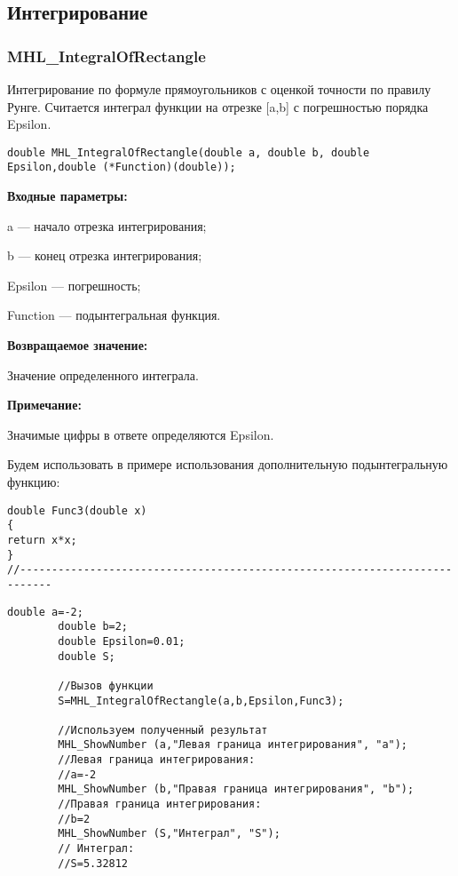 \documentclass[a4paper,12pt]{article}
\begin{document}
\subsection{Интегрирование}

\subsubsection{MHL\_IntegralOfRectangle}\label{MHL_IntegralOfRectangle}

Интегрирование по формуле прямоугольников с оценкой точности по правилу Рунге. Считается интеграл функции на отрезке [a,b] с погрешностью порядка Epsilon.


\begin{lstlisting}[label=code_syntax_MHL_IntegralOfRectangle,caption=Синтаксис]
double MHL_IntegralOfRectangle(double a, double b, double Epsilon,double (*Function)(double));
\end{lstlisting}

\textbf{Входные параметры:}

 a --- начало отрезка интегрирования;
 
 b --- конец отрезка интегрирования;
 
 Epsilon --- погрешность;
 
 Function --- подынтегральная функция.

\textbf{Возвращаемое значение:}
 
 Значение определенного интеграла.
 
 \textbf{Примечание:}
 
 Значимые цифры в ответе определяются Epsilon.

Будем использовать в примере использования дополнительную подынтегральную функцию:

\begin{lstlisting}[caption=Дополнительная функция]
double Func3(double x)
{
return x*x;
}
//---------------------------------------------------------------------------
\end{lstlisting}


\begin{lstlisting}[label=code_use_MHL_IntegralOfRectangle,caption=Пример использования]
        double a=-2;
        double b=2;
        double Epsilon=0.01;
        double S;

        //Вызов функции
        S=MHL_IntegralOfRectangle(a,b,Epsilon,Func3);

        //Используем полученный результат
        MHL_ShowNumber (a,"Левая граница интегрирования", "a");
        //Левая граница интегрирования:
        //a=-2
        MHL_ShowNumber (b,"Правая граница интегрирования", "b");
        //Правая граница интегрирования:
        //b=2
        MHL_ShowNumber (S,"Интеграл", "S");
        // Интеграл:
        //S=5.32812
\end{lstlisting}
\end{document}
